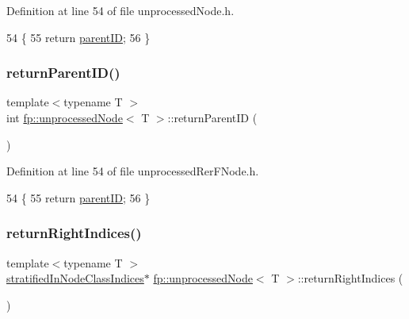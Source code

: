 Definition at line 54 of file unprocessed\+Node.\+h.


\begin{DoxyCode}
54                                            \{
55                     \textcolor{keywordflow}{return} \hyperlink{classfp_1_1unprocessedNode_a74cb75f76c24622444e531a583b75c3d}{parentID};
56                 \}
\end{DoxyCode}
\mbox{\label{classfp_1_1unprocessedNode_aba68d6444ff034f7c43acaf3eeda9520}} 
\subsubsection{\texorpdfstring{return\+Parent\+I\+D()}{returnParentID()}\hspace{0.1cm}{\footnotesize\ttfamily [2/2]}}
{\footnotesize\ttfamily template$<$typename T $>$ \\
int \hyperlink{classfp_1_1unprocessedNode}{fp\+::unprocessed\+Node}$<$ T $>$\+::return\+Parent\+ID (\begin{DoxyParamCaption}{ }\end{DoxyParamCaption})\hspace{0.3cm}{\ttfamily [inline]}}



Definition at line 54 of file unprocessed\+Rer\+F\+Node.\+h.


\begin{DoxyCode}
54                                            \{
55                     \textcolor{keywordflow}{return} \hyperlink{classfp_1_1unprocessedNode_a74cb75f76c24622444e531a583b75c3d}{parentID};
56                 \}
\end{DoxyCode}
\mbox{\label{classfp_1_1unprocessedNode_a41d3bd481930201d6fc481876fd84175}} 
\subsubsection{\texorpdfstring{return\+Right\+Indices()}{returnRightIndices()}\hspace{0.1cm}{\footnotesize\ttfamily [1/2]}}
{\footnotesize\ttfamily template$<$typename T $>$ \\
\hyperlink{classfp_1_1stratifiedInNodeClassIndices}{stratified\+In\+Node\+Class\+Indices}$\ast$ \hyperlink{classfp_1_1unprocessedNode}{fp\+::unprocessed\+Node}$<$ T $>$\+::return\+Right\+Indices (\begin{DoxyParamCaption}{ }\end{DoxyParamCaption})\hspace{0.3cm}{\ttfamily [inline]}}



